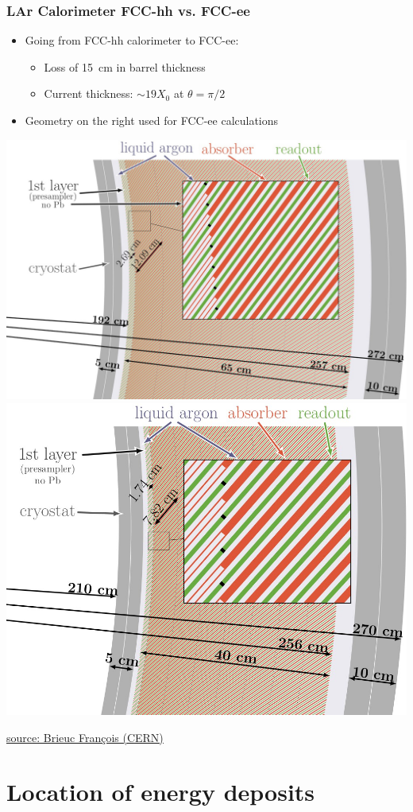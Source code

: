 \documentclass{beamer}
\begin{document}
\begin{frame}
  \frametitle{LAr Calorimeter FCC-hh vs. FCC-ee}

  \begin{itemize}
    \item Going from FCC-hh calorimeter to FCC-ee:
          \begin{itemize}
            \item Loss of 15~cm in barrel thickness
            \item Current thickness: $\sim 19 X_0$ at $\theta = \pi/2$
          \end{itemize}
    \item Geometry on the right used for FCC-ee calculations
  \end{itemize}


  \includegraphics[width=0.49\linewidth]{figures/lar_calo_fcchh.png}
  \includegraphics[width=0.49\linewidth]{figures/lar_calo_fccee.png}

  {\tiny
   \href{https://indico.cern.ch/event/969249/contributions/4086276/attachments/2132741/3591642/20201029_LAr_workingMeeting_Brieuc.pdf}
        {source: Brieuc François (CERN)}}
\end{frame}


\section{Location of energy deposits}
\end{document}
